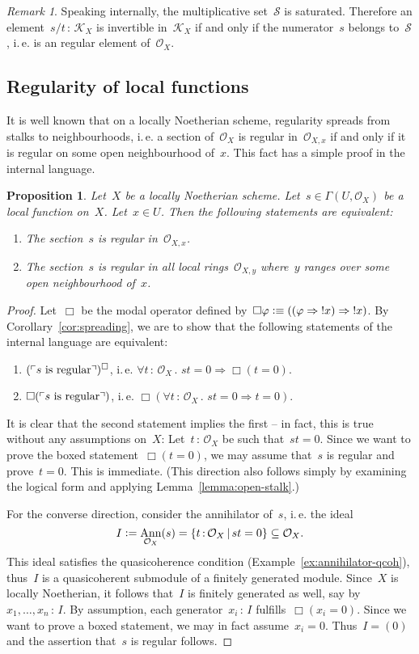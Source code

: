 \documentclass[10pt]{amsart}
\makeatletter
\theoremstyle{definition}
\theoremstyle{plain}
\newtheorem{prop}[defn]{Proposition}
\theoremstyle{remark}
\newtheorem{rem}[defn]{Remark}
\renewcommand{\O}{\mathcal{O}}
\newcommand{\K}{\mathcal{K}}
\renewcommand{\S}{\mathcal{S}}
\DeclareMathOperator{\Ann}{Ann}
\newcommand{\?}{\,{:}\,}
\renewcommand{\_}{\mathpunct{.}\,}
\newcommand{\speak}[1]{\ulcorner\text{\textnormal{#1}}\urcorner}
\newcommand{\ie}{i.\,e.\@\xspace}
\newcommand{\defeq}{\vcentcolon=}
\newcommand{\defequiv}{\vcentcolon\equiv}
\makeatother
\begin{document}
\begin{rem}Speaking internally, the multiplicative set~$\S$ is saturated.
Therefore an element~$s/t \? \K_X$ is invertible in~$\K_X$ if and only if the
numerator~$s$ belongs to~$\S$, \ie is an regular element of~$\O_X$.\end{rem}


\subsection{Regularity of local functions}
It is well known that on a locally Noetherian scheme, regularity spreads from
stalks to neighbourhoods, \ie a section of~$\O_X$ is regular
in~$\O_{X,x}$ if and only if it is regular on some open neighbourhood of~$x$.
This fact has a simple proof in the internal language.
\begin{prop}\label{prop:regularity-spreading}
Let~$X$ be a locally Noetherian scheme. Let~$s \in \Gamma(U,\O_X)$
be a local function on~$X$. Let~$x \in U$. Then the following statements are
equivalent:
\begin{enumerate}
\item The section~$s$ is regular in~$\O_{X,x}$.
\item The section~$s$ is regular in all local rings~$\O_{X,y}$ where~$y$ ranges
over some open neighbourhood of~$x$.
\end{enumerate}
\end{prop}
\begin{proof}
Let~$\Box$ be the modal operator defined by~$\Box\varphi \defequiv ((\varphi
\Rightarrow {!x}) \Rightarrow {!x})$. By Corollary~\ref{cor:spreading}, we are
to show that the following statements of the internal language are equivalent:
\begin{enumerate}
\item $(\speak{$s$ is regular})^\Box$, \ie
$\forall t\?\O_X\_ st = 0 \Rightarrow \Box(t = 0)$.
\item $\Box(\speak{$s$ is regular})$, \ie
$\Box(\forall t\?\O_X\_ st = 0 \Rightarrow t = 0)$.
\end{enumerate}
It is clear that the second statement implies the first -- in fact, this is true
without any assumptions on~$X$: Let~$t\?\O_X$ be such that~$st = 0$. Since we want to
prove the boxed statement~$\Box(t=0)$, we may assume that~$s$ is regular and
prove~$t = 0$. This is immediate. (This direction also follows simply by
examining the logical form and applying Lemma~\ref{lemma:open-stalk}.)

For the converse direction, consider the annihilator of~$s$, \ie the ideal
\[ I \defeq \Ann_{\O_X}(s) = \{ t\?\O_X \,|\, st = 0 \} \subseteq \O_X. \]
This ideal satisfies the quasicoherence condition (Example~\ref{ex:annihilator-qcoh}),
thus~$I$ is a quasicoherent submodule of a finitely generated module. Since~$X$ is
locally Noetherian, it follows that~$I$ is finitely generated as well, say by~$x_1,\ldots,x_n \? I$. By
assumption, each generator~$x_i \? I$ fulfills~$\Box(x_i = 0)$. Since we want
to prove a boxed statement, we may in fact assume~$x_i = 0$. Thus~$I = (0)$ and
the assertion that~$s$ is regular follows.
\end{proof}
\end{document}
